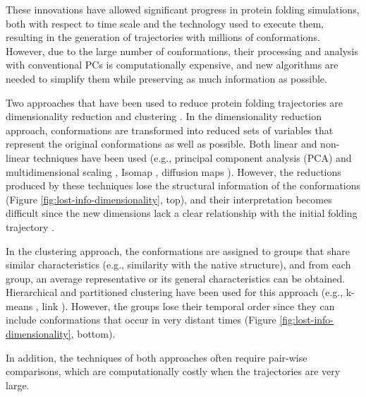 \documentclass[twocolumn]{bmcart}%
\begin{document}
These innovations have allowed significant progress in protein folding simulations, both with respect to time scale and the technology used to execute them, resulting in the generation of trajectories with millions of conformations. However, due to the large number of conformations, their processing and analysis with conventional PCs is computationally expensive, and new algorithms are needed to simplify them while preserving as much information as possible.

Two approaches that have been used to reduce protein folding trajectories are dimensionality reduction \cite{Duan2013} and clustering \cite{Peng2018}. In the dimensionality reduction approach, conformations are transformed into reduced sets of variables that represent the original conformations as well as possible. Both linear and non-linear techniques have been used (e.g., principal component analysis (PCA) and multidimensional scaling \cite{RajanSchulten10}, Isomap \cite{Das2006}, diffusion maps \cite{Kim2015}). However, the reductions produced by these techniques lose the structural information of the conformations (Figure \ref{fig:lost-info-dimensionality}, top), and their interpretation becomes difficult since the new dimensions lack a clear relationship with the initial folding trajectory \cite{Cavallo2018}.

In the clustering approach, the conformations are assigned to groups that share similar characteristics (e.g., similarity with the native structure), and from each group, an average representative or its general characteristics can be obtained. Hierarchical and partitioned clustering have been used for this approach (e.g., k-means \cite{Doerr2017}, link \cite{Shao2007}). However, the groups lose their temporal order since they can include conformations that occur in very distant times (Figure \ref{fig:lost-info-dimensionality}, bottom).

In addition, the techniques of both approaches often require pair-wise comparisons, which are computationally costly when the trajectories are very large.
\end{document}
